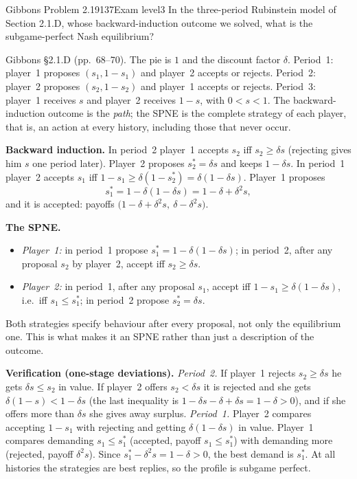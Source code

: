 \begin{exsol}{Gibbons Problem 2.19}{137}{Exam level}{3}
\asked In the three-period Rubinstein model of Section 2.1.D, whose backward-induction outcome we solved, what
is the subgame-perfect Nash equilibrium?

\method Gibbons \S2.1.D (pp.~68--70). The pie is $1$ and the discount factor $\delta$. Period~1: player~1
proposes $(s_1, 1-s_1)$ and player~2 accepts or rejects. Period~2: player~2 proposes $(s_2, 1-s_2)$ and
player~1 accepts or rejects. Period~3: player~1 receives $s$ and player~2 receives $1-s$, with $0 < s < 1$.
The backward-induction outcome is the \emph{path}; the SPNE is the complete strategy of each player, that is, an
action at every history, including those that never occur.

\solution
\textbf{Backward induction.} In period~2 player~1 accepts $s_2$ iff $s_2 \ge \delta s$ (rejecting gives him $s$
one period later). Player~2 proposes $s_2^* = \delta s$ and keeps $1 - \delta s$. In period~1 player~2
accepts $s_1$ iff $1 - s_1 \ge \delta(1 - s_2^*) = \delta(1 - \delta s)$. Player~1 proposes
\[
  s_1^* = 1 - \delta(1 - \delta s) = 1 - \delta + \delta^2 s ,
\]
and it is accepted: payoffs $\bigl(1 - \delta + \delta^2 s,\ \delta - \delta^2 s\bigr)$.

\textbf{The SPNE.}
\begin{itemize}
  \item \emph{Player~1:} in period~1 propose $s_1^* = 1 - \delta(1 - \delta s)$; in period~2, after any
  proposal $s_2$ by player~2, accept iff $s_2 \ge \delta s$.
  \item \emph{Player~2:} in period~1, after any proposal $s_1$, accept iff $1 - s_1 \ge \delta(1 - \delta s)$,
  i.e.\ iff $s_1 \le s_1^*$; in period~2 propose $s_2^* = \delta s$.
\end{itemize}
Both strategies specify behaviour after every proposal, not only the equilibrium one. This is what makes it an
SPNE rather than just a description of the outcome.

\textbf{Verification (one-stage deviations).} \emph{Period~2.} If player~1 rejects $s_2 \ge \delta s$
he gets $\delta s \le s_2$ in value. If player~2 offers $s_2 < \delta s$ it is rejected and she gets
$\delta(1 - s) < 1 - \delta s$ (the last inequality is $1 - \delta s - \delta + \delta s = 1 - \delta > 0$), and
if she offers more than $\delta s$ she gives away surplus. \emph{Period~1.} Player~2 compares accepting
$1 - s_1$ with rejecting and getting $\delta(1 - \delta s)$ in value. Player~1 compares demanding $s_1 \le
s_1^*$ (accepted, payoff $s_1 \le s_1^*$) with demanding more (rejected, payoff $\delta^2 s$). Since
$s_1^* - \delta^2 s = 1 - \delta > 0$, the best demand is $s_1^*$. At all histories the strategies are best
replies, so the profile is subgame perfect.


\end{exsol}

